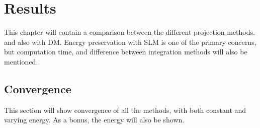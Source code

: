 \chapter{Results}
This chapter will contain a comparison between the different projection methods, and also with DM. Energy preservation with SLM is one of the primary concerns, but computation time, and difference between integration methods will also be mentioned.
\section{Convergence}%
This section will show convergence of all the methods, with both constant and varying energy. As a bonus, the energy will also be shown.

